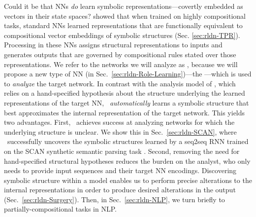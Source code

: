 Could it be that NNs \textit{do} learn symbolic representations---covertly embedded as vectors in their state spaces?
\citet{mccoy} showed that 
when trained on highly compositional tasks, 
standard NNs learned representations that are functionally equivalent to compositional vector embeddings of symbolic structures (Sec. \ref{sec:rldn-TPR}). Processing in these NNs assigns structural representations to inputs and generates outputs that are governed by compositional rules stated over those representations. We refer to the networks we will analyze as , because we will propose a new type of NN (in Sec.~\ref{sec:rldn-Role-Learning})---the ---which is used to \textit{analyze} the target network.
In contrast with the analysis model of \citet{mccoy}, which relies on a hand-specified hypothesis about the structure underlying the learned representations of the target NN, \RLN\ \textit{automatically} learns a symbolic structure that best approximates the internal representation of the target network. This yields 
two %
advantages. 
First, \RLN\ achieves success at analyzing networks for which the underlying structure is unclear. We show this in Sec.~\ref{sec:rldn-SCAN}, where \RLN\ successfully uncovers the symbolic structures learned by a seq2seq RNN trained on the SCAN synthetic semantic parsing task \citep{lake2018generalization}. Second, removing the need for hand-specified structural hypotheses reduces the burden on the analyst, who only needs to provide input sequences and their target NN encodings. Discovering symbolic structure within a model enables us to perform precise alterations to the internal representations in order to produce desired alterations in the output (Sec.~\ref{sec:rldn-Surgery}). Then, in Sec.~\ref{sec:rldn-NLP}, we turn briefly to partially-compositional tasks in NLP.

